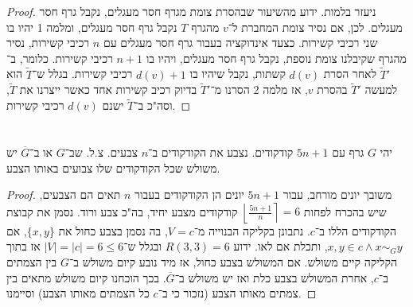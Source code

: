 \documentclass[]{article}
\newcommand\rc    {\right\rceil}
\newcommand\lf    {\left\lfloor}
\newcommand\ol    {\overline}
\newcommand\tl    {\tilde}
\begin{document}
\begin{proof}
		ניעזר בלמות. ידוע מהשיעור שבהסרת צומת מגרף חסר מעגלים, נקבל גרף חסר מעגלים. לכן, אם נסיר צומת המחברת ל־$v$ מהגרף $T$ נקבל גרף חסר מעגלים, ומלמה 1 יהיו בו שני רכיבי קשירות. כצעד אינדוקציה בעבור גרף חסר מעגלים עם $n$ רכיבי קשירות, נסיר מהגרף שקיבלנו צומת נוספת, נקבל גרף חסר מעגלים, ויהיו בו $n + 1$ רכיבי קשירות. כלומר, ב־$\tl T'$ לאחר הסרת $d(v)$ קשתות, נקבל שיהיו בו $d(v) + 1$ רכיבי קשירות. בגלל ש־$\tl T$ הוא למעשה $\tl T'$ בהסרת $v$, אז מלמה 2 הסרנו מ־$\tl T'$ בדיוק רכיב קשירות אחד כאשר ייצרנו את $\tl T$, וסה"כ ב־$\tl T$ ישנם $d(v)$ רכיבי קשירות. 
	\end{proof}
	\section{}
	\section{}
	\section{}
	יהי $G$ גרף עם $5n + 1$ קודקודים. נצבע את הקודקודים ב־$n$ צבעים. צ.ל. שב־$G$ או ב־$\ol G$ יש משולש שכל הקודקודים שלו צבועים באותו הצבע. 
	
	\begin{proof}
		משובך יונים מורחב, עבור $5n  +1$ יונים הן הקודקודים בעבור $n$ תאים הם הצבעים, שיש בהכרח לפחות $\lf \frac{5n + 1}{n} \rc = 6$ קודקודים מצבע יחיד, בה"כ צבע ורוד. נסמן את קבוצת הקודקודים הללו ב־$c$. נתבונן בקליקה הבנוייה מ־$V = c$, בה נסמן בצבע כחול את $\{x, y\}$, אם $x, y \in c \land x \sim_G y$, ותכלת אם לאו. ידוע $R(3, 3) = 6$ ובגלל ש־$|V| = |c| = 6 \le 6$ אז בתוך הקליקה קיים משולש. אם המשולש בצבע כחול, אז מיד נובע קיום משולש ב־$G$ בין הצמתים ב־$c$, אחרת המשולש בצבע כלת ואז יש משולש ב־$\ol G$. בכך הוכחנו קיום משולש מתאים בין צמתים מאותו הצבע (נזכור כי ב־$c$ כל הצמתים מאותו הצבע) וסיימנו. 
	\end{proof}
	
\end{document}

